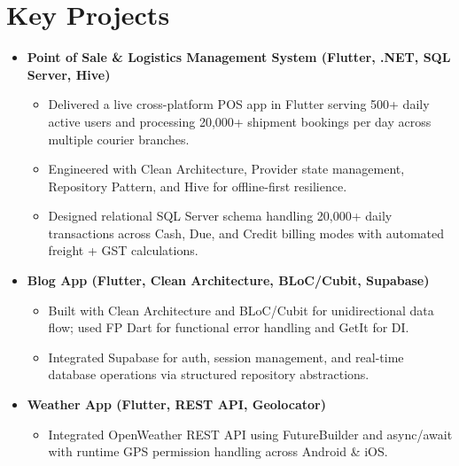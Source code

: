 \documentclass[11pt,a4paper,sans]{moderncv}
\begin{document}
\section{Key Projects}
\vspace{1pt}
\begin{itemize}

\item{\textbf{Point of Sale \& Logistics Management System (Flutter, .NET, SQL Server, Hive)}}
\begin{itemize}
    \item {Delivered a live cross-platform POS app in Flutter serving 500+ daily active users and processing 20,000+ shipment bookings per day across multiple courier branches.}
    \item {Engineered with Clean Architecture, Provider state management, Repository Pattern, and Hive for offline-first resilience.}
    \item {Designed relational SQL Server schema handling 20,000+ daily transactions across Cash, Due, and Credit billing modes with automated freight + GST calculations.}
\end{itemize}

\vspace{2pt}

\item{\textbf{Blog App (Flutter, Clean Architecture, BLoC/Cubit, Supabase)}}
\begin{itemize}
    \item {Built with Clean Architecture and BLoC/Cubit for unidirectional data flow; used FP Dart for functional error handling and GetIt for DI.}
    \item {Integrated Supabase for auth, session management, and real-time database operations via structured repository abstractions.}
\end{itemize}

\vspace{2pt}

\item{\textbf{Weather App (Flutter, REST API, Geolocator)}}
\begin{itemize}
    \item {Integrated OpenWeather REST API using FutureBuilder and async/await with runtime GPS permission handling across Android \& iOS.}
\end{itemize}

\end{itemize}

\end{document}
